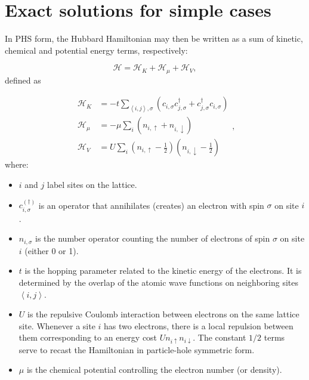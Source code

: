 \section{Exact solutions for simple cases}\label{sec:exactSolutions}

In \ac{PHS} form, the Hubbard Hamiltonian may then be written as a sum of kinetic, chemical and potential energy terms, respectively:

\begin{equation}\label{eq:hubbard}
\mathcal{H} = \mathcal{H}_K + \mathcal{H}_\mu + \mathcal{H}_V ,
\end{equation}
defined as

\begin{equation}\label{eq:def_energies}
\begin{split}
\mathcal{H}_K &= -t \sum_{\left\langle i, j \right \rangle, \sigma} ( c_{i,\sigma} c_{j,\sigma}^\dagger + c_{j,\sigma}^\dagger c_{i,\sigma} ) \\
\mathcal{H}_\mu &= -\mu \sum_i ( n_{i,\uparrow} + n_{i,\downarrow} ) \\
\mathcal{H}_V &= U \sum_{i} ( n_{i,\uparrow} - \frac{1}{2} ) ( n_{i,\downarrow} - \frac{1}{2} )
\end{split} ,
\end{equation}
where:

\begin{itemize}
\item $i$ and $j$ label sites on the lattice.
\item $c_{i,\sigma}^{(\dagger)}$ is an operator that annihilates (creates) an electron with spin $\sigma$ on site $i$.
\item $n_{i,\sigma}$ is the number operator counting the number of electrons of spin $\sigma$ on site $i$ (either 0 or 1).
\item $t$ is the hopping parameter related to the kinetic energy of the electrons.
It is determined by the overlap of the atomic wave functions on neighboring sites $\left\langle i, j \right\rangle$.
\item $U$ is the repulsive Coulomb interaction between electrons on the same lattice site.
Whenever a site $i$ has two electrons, there is a local repulsion between them corresponding to an energy cost $U n_{i \uparrow} n_{i \downarrow}$.
The constant $1/2$ terms serve to recast the Hamiltonian in particle-hole symmetric form.
\item $\mu$ is the chemical potential controlling the electron number (or density).
\end{itemize}

